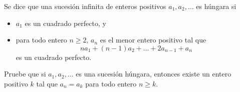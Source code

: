 Se dice que una sucesión infinita de enteros positivos $a_1, a_2, \dots$ es húngara si
 \begin{itemize} 
 \item  $a_1$ es un cuadrado perfecto, y
 \item  para todo entero $n\ge 2$, $a_n$ es el menor entero positivo tal que \[na_1+(n-1)a_2+\dots+2a_{n-1}+a_n\]
es un cuadrado perfecto.
 \end{itemize} 
Pruebe que si $a_1, a_2, \dots$ es una sucesión húngara, entonces existe un entero positivo $k$ tal que $a_n=a_k$ para todo entero $n\geq k$.